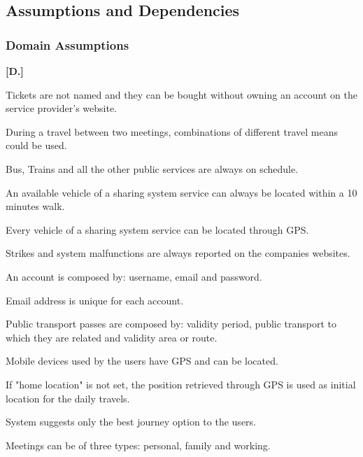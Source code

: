 \subsection{Assumptions and Dependencies}
\subsubsection{Domain Assumptions}
\begin{list}
{\bfseries{}[D.]~}
{
}
\item
Tickets are not named and they can be bought without owning an account on the service provider's website.
\item
During a travel between two meetings, combinations of different travel means could be used.
\item
Bus, Trains and all the other public services are always on schedule.
\item
An available vehicle of a sharing system service can always be located within a 10 minutes walk.
\item
Every vehicle of a sharing system service can be located through GPS.
\item
Strikes and system malfunctions are always reported on the companies websites.
\item
An account is composed by: username, email and password.
\item
Email address is unique for each account.
\item
Public transport passes are composed by: validity period, public transport to which they are related and validity area or route.
\item
Mobile devices used by the users have GPS and can be located.
\item
If "home location" is not set, the position retrieved through GPS is used as initial location for the daily travels.
\item
System suggests only the best journey option to the users.
\item
Meetings can be of three types: personal, family and working.
\end{list}